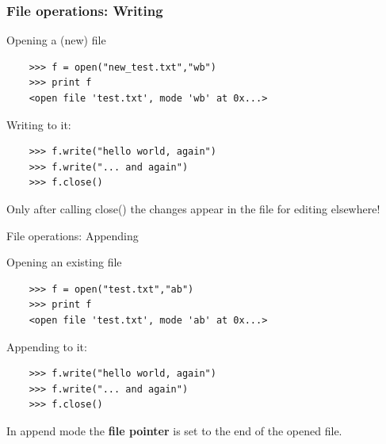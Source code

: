 \documentclass[xcolor=table,10pt]{beamer}
\begin{document}
\begin{frame}[fragile]

  \frametitle{File operations: Writing}

  Opening a (new) file 

  \begin{verbatim}
    >>> f = open("new_test.txt","wb")
    >>> print f
    <open file 'test.txt', mode 'wb' at 0x...>
  \end{verbatim}
  \bigskip
  \pause
  Writing to it:
  \begin{verbatim}
    >>> f.write("hello world, again")
    >>> f.write("... and again")
    >>> f.close()
  \end{verbatim}
  \pause
  \vspace{0.65cm}

  \begin{arrowlist}
  \item Only after calling close() the changes appear in the file for
    editing elsewhere!
  \end{arrowlist}

\end{frame}

\begin{frame}[fragile]{File operations: Appending}

  Opening an existing file 

  \begin{verbatim}
    >>> f = open("test.txt","ab")
    >>> print f
    <open file 'test.txt', mode 'ab' at 0x...>
  \end{verbatim}
  \bigskip
  \pause  

  Appending to it:
  \begin{verbatim}
    >>> f.write("hello world, again")
    >>> f.write("... and again")
    >>> f.close()
  \end{verbatim}
  \pause
  \vspace{0.8cm}

  \begin{arrowlist}
  \item In append mode the \textbf{file pointer} is set to the end of the opened file.
  \end{arrowlist}

\end{frame}
\end{document}
